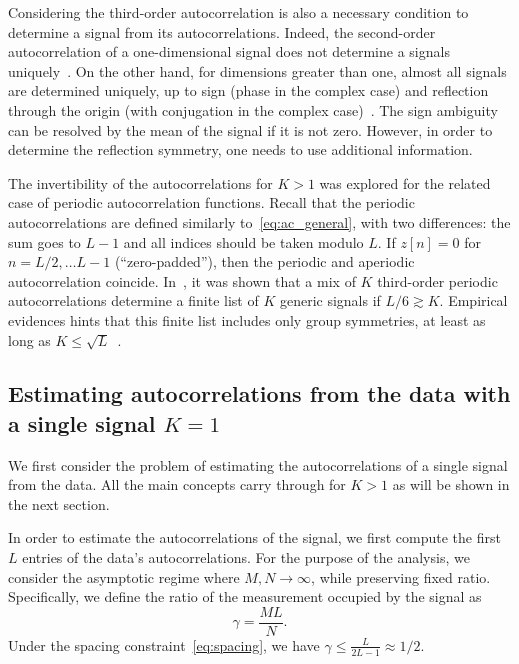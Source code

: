 \documentclass[english,11pt]{article}
\numberwithin{equation}{section}
\theoremstyle{plain}
\theoremstyle{definition}
\theoremstyle{remark}
\theoremstyle{plain}
\theoremstyle{remark}
\theoremstyle{plain}
\theoremstyle{plain}
\begin{document}
Considering the third-order autocorrelation is also a necessary condition to determine a signal from its autocorrelations. Indeed, the second-order autocorrelation of a one-dimensional signal does not determine a signals uniquely~\cite{beinert2015ambiguities,bendory2017fourier}. On the other hand, for dimensions greater than one, almost all signals are determined uniquely, up to sign (phase in the complex case) and reflection through the origin (with conjugation in the complex case)~\cite{hayes1982reconstruction,hayes1982reducible}. The sign ambiguity can be resolved by the mean of the signal if it is not zero. However,  in order to determine the reflection symmetry, one needs to use additional information.

The invertibility of the autocorrelations for $K>1$ was explored  for the related case of  periodic autocorrelation functions. Recall that the  periodic autocorrelations are defined similarly to~\eqref{eq:ac_general}, with two differences: the sum goes to $L-1$ and all indices should be taken modulo $L$.
If $z[n]=0$ for $n=L/2,\ldots L-1$ (``zero-padded''), then the periodic and aperiodic autocorrelation coincide.
In~\cite{bandeira2017estimation}, it was shown that a mix of $K$ third-order periodic autocorrelations determine  a finite list of $K$ generic signals if $L/6\gtrsim K$. Empirical evidences hints that this finite list includes only group symmetries, at least as long as $K\leq\sqrt{L}$~\cite{boumal2017heterogeneous}. 


\subsection{Estimating autocorrelations from the data with a single signal $K=1$} \label{sec:estimating_ac_k1}

We first consider the problem of estimating the autocorrelations of a single signal from the data. 
All the main concepts carry through for $K>1$ as will be shown in the next section.  

In order to estimate the autocorrelations of the signal, we first compute the first $L$ entries of the data's autocorrelations. 
For the purpose of the analysis, we consider  the asymptotic regime where $M,N\to\infty$, while preserving fixed ratio. 
Specifically, we define the ratio of the measurement occupied by  the signal as
\begin{equation}
\gamma = \frac{M L}{N}.
\end{equation}
Under the spacing constraint~\eqref{eq:spacing}, we have $\gamma\leq\frac{L}{2L-1}\approx 1/2$.
\end{document}
